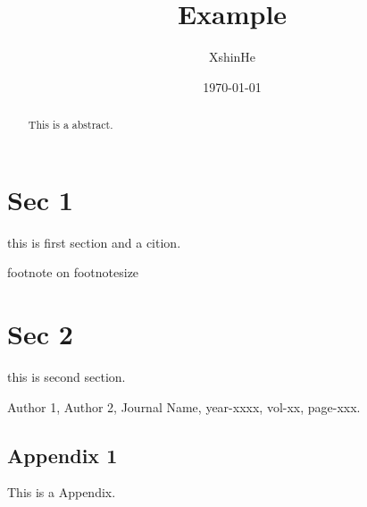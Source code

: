 \documentclass[UTF8,a4paper,11pt]{article}
\title{Example}
\author{XshinHe}
\date{\today}
\begin{document}
\maketitle     %
\tableofcontents  %

\begin{abstract}
This is a abstract.
\end{abstract}


\section{Sec 1}
this is first section and a cition\cite{1}.

\footnotesize{\centering footnote on footnotesize}


\section{Sec 2}
this is second section.


\begin{thebibliography}{9}
 Author 1, Author 2, Journal Name, year-xxxx, vol-xx, page-xxx.
\end{thebibliography}


\begin{appendix}              
\section{Appendix 1}
This is a Appendix.
\end{appendix}
\end{document}
